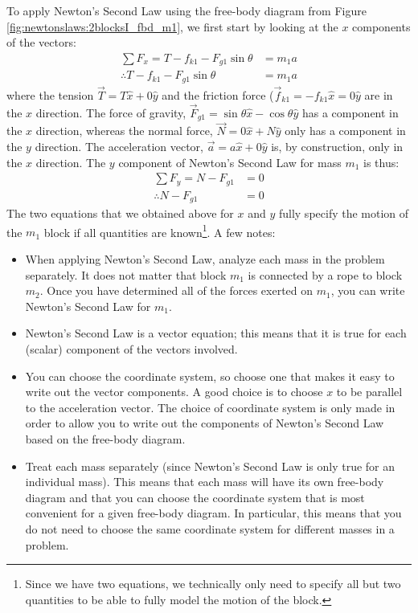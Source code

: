 To apply Newton's Second Law using the free-body diagram from Figure \ref{fig:newtonslaws:2blocksI_fbd_m1}, we first start by looking at the $x$ components of the vectors:
\begin{align*}
\sum F_x = T-f_{k1}-F_{g1}\sin\theta &= m_1 a\\
\therefore T-f_{k1}-F_{g1}\sin\theta &= m_1 a
\end{align*}
where the tension $\vec T = T\hat x+0\hat y$ and the friction force ($\vec f_{k1}=-f_{k1}\hat x=0\hat y$ are in the $x$ direction. The force of gravity, $\vec F_{g1}=\sin\theta \hat x-\cos\theta \hat y$ has a component in the $x$ direction, whereas the normal force, $\vec N=0\hat x+N\hat y$ only has a component in the $y$ direction. The acceleration vector, $\vec a=a\hat x+0\hat y$ is, by construction, only in the $x$ direction. The $y$ component of Newton's Second Law for mass $m_1$ is thus:
\begin{align*}
\sum F_y = N-F_{g1}&=0\\
\therefore N-F_{g1}&=0
\end{align*}
The two equations that we obtained above for $x$ and $y$ fully specify the motion of the $m_1$ block if all quantities are known\footnote{Since we have two equations, we technically only need to specify all but two quantities to be able to fully model the motion of the block.}. A few notes:
\begin{itemize}
\item When applying Newton's Second Law, analyze each mass in the problem separately. It does not matter that block $m_1$ is connected by a rope to block $m_2$. Once you have determined all of the forces exerted on $m_1$, you can write Newton's Second Law for $m_1$.
\item Newton's Second Law is a vector equation; this means that it is true for each (scalar) component of the vectors involved.
\item You can choose the coordinate system, so choose one that makes it easy to write out the vector components. A good choice is to choose $x$ to be parallel to the acceleration vector. The choice of coordinate system is only made in order to allow you to write out the components of Newton's Second Law based on the free-body diagram.
\item Treat each mass separately (since Newton's Second Law is only true for an individual mass). This means that each mass will have its own free-body diagram and that you can choose the coordinate system that is most convenient for a given free-body diagram. In particular, this means that you do not need to choose the same coordinate system for different masses in a problem.
\end{itemize}

